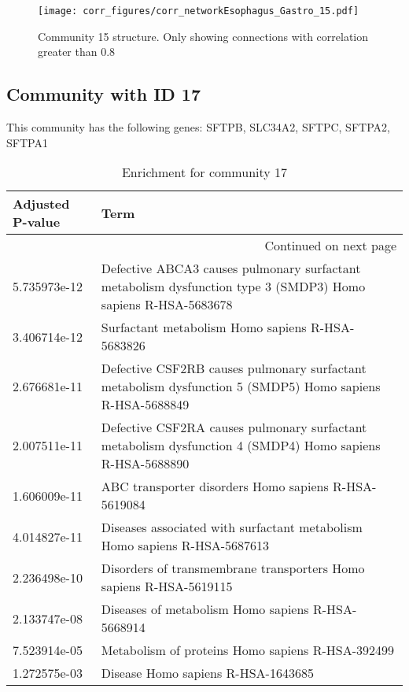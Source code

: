 \begin{figure}[h!]
\centering
\texttt{[image: corr\_figures/corr\_networkEsophagus\_Gastro\_15.pdf]}
\caption{Community 15 structure. Only showing connections with correlation greater than 0.8}
\end{figure}




\subsection*{Community with ID 17}
This community has the following genes: SFTPB, SLC34A2, SFTPC, SFTPA2, SFTPA1
\\
\begin{longtable}{p{2.4cm}p{14.5cm}}
\caption{Enrichment for community 17}\\
\toprule
Adjusted \newline P-value &                                                                                                          Term \\
\midrule
\endhead
\midrule
\multicolumn{2}{r}{{Continued on next page}} \\
\midrule
\endfoot

\bottomrule
\endlastfoot
             5.735973e-12 &  Defective ABCA3 causes pulmonary surfactant metabolism dysfunction type 3 (SMDP3) Homo sapiens R-HSA-5683678 \\
             3.406714e-12 &                                                              Surfactant metabolism Homo sapiens R-HSA-5683826 \\
             2.676681e-11 &      Defective CSF2RB causes pulmonary surfactant metabolism dysfunction 5 (SMDP5) Homo sapiens R-HSA-5688849 \\
             2.007511e-11 &      Defective CSF2RA causes pulmonary surfactant metabolism dysfunction 4 (SMDP4) Homo sapiens R-HSA-5688890 \\
             1.606009e-11 &                                                          ABC transporter disorders Homo sapiens R-HSA-5619084 \\
             4.014827e-11 &                                     Diseases associated with surfactant metabolism Homo sapiens R-HSA-5687613 \\
             2.236498e-10 &                                            Disorders of transmembrane transporters Homo sapiens R-HSA-5619115 \\
             2.133747e-08 &                                                             Diseases of metabolism Homo sapiens R-HSA-5668914 \\
             7.523914e-05 &                                                              Metabolism of proteins Homo sapiens R-HSA-392499 \\
             1.272575e-03 &                                                                            Disease Homo sapiens R-HSA-1643685 \\
\end{longtable}


